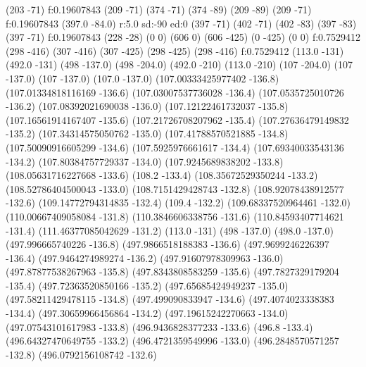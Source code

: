 {\lvec (203 -71)
\lfill f:0.19607843
\move (209 -71)
\lvec (374 -71)
\lvec (374 -89)
\lvec (209 -89)
\lvec (209 -71)
\lfill f:0.19607843
\move(397.0 -84.0)
\larc r:5.0 sd:-90 ed:0
\move (397 -71)
\lvec (402 -71)
\lvec (402 -83)
\lvec (397 -83)
\lvec (397 -71)
\lfill f:0.19607843
\htext (228 -28) {\matrixfontselect \color{white}{Binary Search Tree}}
\move (0 0)
\lvec (606 0)
\lvec (606 -425)
\lvec (0 -425)
\lvec (0 0)
\lfill f:0.7529412
\move (298 -416)
\lvec (307 -416)
\lvec (307 -425)
\lvec (298 -425)
\lvec (298 -416)
\lfill f:0.7529412
\move (113.0 -131)
\lvec (492.0 -131)
\move (498 -137.0)
\lvec (498 -204.0)
\move (492.0 -210)
\lvec (113.0 -210)
\move (107 -204.0)
\lvec (107 -137.0)
\move (107 -137.0)
\lvec (107.0 -137.0)
\lvec (107.00333425977402 -136.8)
\lvec (107.01334818116169 -136.6)
\lvec (107.03007537736028 -136.4)
\lvec (107.0535725010726 -136.2)
\lvec (107.08392021690038 -136.0)
\lvec (107.12122461732037 -135.8)
\lvec (107.16561914167407 -135.6)
\lvec (107.21726708207962 -135.4)
\lvec (107.27636479149832 -135.2)
\lvec (107.34314575050762 -135.0)
\lvec (107.41788570521885 -134.8)
\lvec (107.50090916605299 -134.6)
\lvec (107.5925976661617 -134.4)
\lvec (107.69340033543136 -134.2)
\lvec (107.80384757729337 -134.0)
\lvec (107.9245689838202 -133.8)
\lvec (108.05631716227668 -133.6)
\lvec (108.2 -133.4)
\lvec (108.35672529350244 -133.2)
\lvec (108.52786404500043 -133.0)
\lvec (108.7151429428743 -132.8)
\lvec (108.92078438912577 -132.6)
\lvec (109.14772794314835 -132.4)
\lvec (109.4 -132.2)
\lvec (109.68337520964461 -132.0)
\lvec (110.00667409058084 -131.8)
\lvec (110.3846606338756 -131.6)
\lvec (110.84593407714621 -131.4)
\lvec (111.46377085042629 -131.2)
\lvec (113.0 -131)
\move (498 -137.0)
\lvec (498.0 -137.0)
\lvec (497.996665740226 -136.8)
\lvec (497.9866518188383 -136.6)
\lvec (497.9699246226397 -136.4)
\lvec (497.9464274989274 -136.2)
\lvec (497.91607978309963 -136.0)
\lvec (497.87877538267963 -135.8)
\lvec (497.8343808583259 -135.6)
\lvec (497.7827329179204 -135.4)
\lvec (497.72363520850166 -135.2)
\lvec (497.65685424949237 -135.0)
\lvec (497.58211429478115 -134.8)
\lvec (497.499090833947 -134.6)
\lvec (497.4074023338383 -134.4)
\lvec (497.30659966456864 -134.2)
\lvec (497.19615242270663 -134.0)
\lvec (497.07543101617983 -133.8)
\lvec (496.9436828377233 -133.6)
\lvec (496.8 -133.4)
\lvec (496.64327470649755 -133.2)
\lvec (496.4721359549996 -133.0)
\lvec (496.2848570571257 -132.8)
\lvec (496.0792156108742 -132.6)
}
